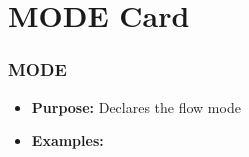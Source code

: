\section{MODE Card}

\begin{frame}\frametitle{MODE}

\begin{itemize}{}
\item[] \textbf{Purpose:} Declares the flow mode


\item[] \textbf{Examples:}
\end{itemize}

\end{frame}


